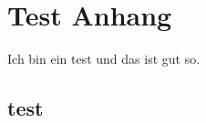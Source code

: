 \documentclass[.\jobname.tex]{subfiles}
\begin{document}
\chapter{Test Anhang}\label{sec: test anhang}
%
Ich bin ein test und das ist gut so.
%
\section{test}
%
\blinddocument
\end{document}
